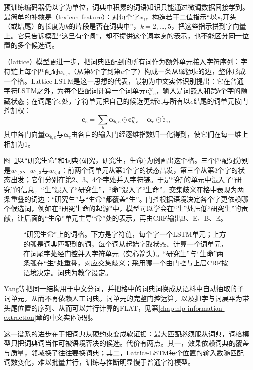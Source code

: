 预训练编码器仍以字为单位，词典中积累的词语知识只能通过微调数据间接学到。最简单的补救是（lexicon feature）：对每个字$x_i$，构造若干二值指示“以$x_i$开头（或结尾）的长度为$k$的片段是否在词典中”，$k=2,\ldots,5$，把这些指示拼到字向量上。它只告诉模型“这里有个词”，却不提供这个词本身的表示，也不能区分同一位置的多个候选词。

（lattice）模型更进一步，把词典匹配到的所有词作为额外单元接入字符序列：字符链上每个匹配词$w_{b,e}$（从第$b$个字到第$e$个字）构成一条从$b$跳到$e$的边，整体形成一个格。Lattice-LSTM是这一思想的代表，最初为中文实体识别提出：它在普通字符LSTM之外，为每个匹配词计算一个词单元$\bm c^{\mathrm w}_{b,e}$，输入是词嵌入和第$b$个字的隐藏状态；在词尾字$e$处，字符单元把自己的候选更新$\tilde{\bm c}_e$与所有以$e$结尾的词单元按门控加权：
\[
  \bm c_e=\sum_{b}\bm\alpha_{b,e}\odot\bm c^{\mathrm w}_{b,e}+\bm\alpha_e\odot\tilde{\bm c}_e,
\]
其中各门向量$\bm\alpha_{b,e}$与$\bm\alpha_e$由各自的输入门经逐维指数归一化得到，使它们在每一维上相加为1。

图~\ref{fig:nlp-analysis-lattice}以“研究生命”和词典$\{$研究，研究生，生命$\}$为例画出这个格。三个匹配词分别是$w_{1,2}$、$w_{1,3}$与$w_{3,4}$：前两个词单元从第1个字的状态出发，第三个从第3个字的状态出发；它们分别在第2、3、4个字处并入字符链。于是“究”的单元中混入了“研究”的信息，“生”混入了“研究生”，“命”混入了“生命”。交集歧义在格中表现为两条重叠的词边：“研究生”与“生命”都覆盖“生”。门控根据语境决定各个字更依赖哪个候选词，例如在“研究生命的起源”中，模型可以学会在“生”处压低“研究生”的贡献，让后面的“生命”单元主导“命”处的表示，再由CRF输出B、E、B、E。

\begin{figure}[htbp]
  \centering
  
  \caption{“研究生命”上的词格。下方是字符链，每个字一个LSTM单元；上方的弧是词典匹配到的词，每个词从起始字取状态、计算一个词单元，在词尾字处经门控并入字符单元（实心箭头）。“研究生”与“生命”两条弧在“生”处重叠，对应交集歧义；采用哪一个由门控与上层CRF按语境决定。词典为教学设定。}
  \label{fig:nlp-analysis-lattice}
\end{figure}

Yang等把同一结构用于中文分词，并把格中的词典词换成从语料中自动抽取的子词单元，从而不再依赖人工词典。词单元的完整门控运算，以及把字与词展平为带头尾位置的序列、从而可以并行计算的FLAT，见第\ref{chap:nlp-information-extraction}章的中文实体识别。

这一谱系的进步在于把词典从硬约束变成软证据：最大匹配必须服从词典，词格模型只把词典词当作可被语境否决的候选。代价有两点。其一，效果依赖词典的覆盖与质量，领域换了往往要换词典；其二，Lattice-LSTM每个位置的输入数随匹配词数变化，难以批量并行，训练与推断明显慢于普通字符模型。

